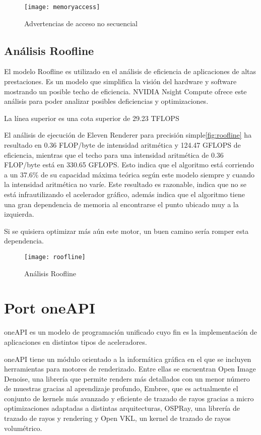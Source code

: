 \begin{figure}[H]
    \centering
	\texttt{[image: memoryaccess]}
	\caption{Advertencias de acceso no secuencial}
	\label{fig:label}
\end{figure}



\section{Análisis Roofline}
	
El modelo Roofline es utilizado en el análisis de eficiencia de aplicaciones de altas prestaciones. Es un modelo que simplifica la visión del hardware y software mostrando un posible techo de eficiencia. NVIDIA Nsight Compute ofrece este análisis para poder analizar posibles deficiencias y optimizaciones.

La línea superior es una cota superior de 29.23 TFLOPS

El análisis de ejecución de Eleven Renderer para precisión simple\autoref{fig:roofline} ha resultado en 0.36 FLOP/byte de intensidad aritmética y 124.47 GFLOPS de eficiencia, mientras que el techo para una intensidad aritmética de 0.36 FLOP/byte está en 330.65 GFLOPS. Esto indica que el algoritmo está corriendo a un 37.6\% de su capacidad máxima teórica según este modelo siempre y cuando la intensidad aritmética no varíe. Este resultado es razonable, indica que no se está infrautilizando el acelerador gráfico, además indica que el algoritmo tiene una gran dependencia de memoria al encontrarse el punto ubicado muy a la izquierda.

Si se quisiera optimizar más aún este motor, un buen camino sería romper esta dependencia.

\begin{figure}[H]
    \centering
	\texttt{[image: roofline]}
	\caption{Análisis Roofline}
	\label{fig:roofline}
\end{figure}

\chapter{Port oneAPI}
	
oneAPI es un modelo de programación unificado cuyo fin es la implementación de aplicaciones en distintos tipos de aceleradores. 


oneAPI tiene un módulo orientado a la informática gráfica en el que se incluyen herramientas para motores de renderizado. Entre ellas se encuentran Open Image Denoise, una librería que permite renders más detallados con un menor número de muestras gracias al aprendizaje profundo, Embree, que es actualmente el conjunto de kernels más avanzado y eficiente de trazado de rayos gracias a micro optimizaciones adaptadas a distintas arquitecturas, OSPRay, una librería de trazado de rayos y rendering y Open VKL, un kernel de trazado de rayos volumétrico.

